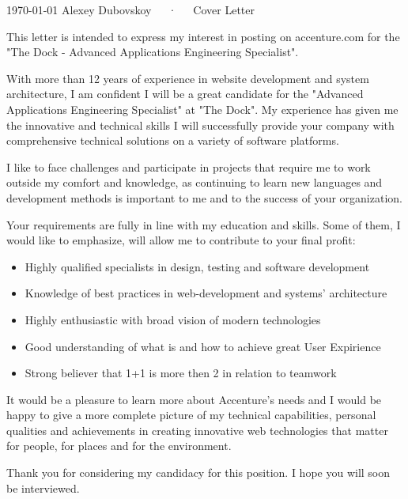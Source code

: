 \documentclass[11pt, a4paper]{awesome-cv}
\begin{document}
\makecvheader[R]

\makecvfooter
  {\today}
  {Alexey Dubovskoy~~~·~~~Cover Letter}
  {}

\makelettertitle

\begin{cvletter}


This letter is intended to express my interest in posting on accenture.com for the "The Dock - Advanced Applications Engineering Specialist".



With more than 12 years of experience in website development and system architecture, I am confident I will be a great candidate for the "Advanced Applications Engineering Specialist" at "The Dock". My experience has given me the innovative and technical skills I will successfully provide your company with comprehensive technical solutions on a variety of software platforms.


I like to face challenges and participate in projects that require me to work outside my comfort and knowledge, as continuing to learn new languages and development methods is important to me and to the success of your organization.


Your requirements are fully in line with my education and skills. Some of them, I would like to emphasize, will allow me to contribute to your final profit:

\begin{itemize}
  \item Highly qualified specialists in design, testing and software development
  \item Knowledge of best practices in web-development and systems' architecture
  \item Highly enthusiastic with broad vision of modern technologies
  \item Good understanding of what is and how to achieve great User Expirience
  \item Strong believer that 1+1 is more then 2 in relation to teamwork
\end{itemize}


It would be a pleasure to learn more about Accenture's needs and I would be happy to give a more complete picture of my technical capabilities, personal qualities and achievements in creating innovative web technologies that matter for people, for places and for the environment.

Thank you for considering my candidacy for this position. I hope you will soon be interviewed.


\end{cvletter}


\makeletterclosing
\end{document}
